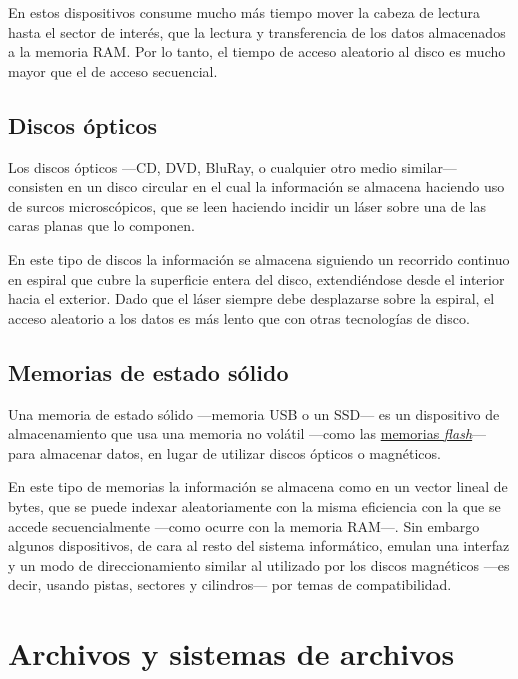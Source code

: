 En estos dispositivos consume mucho más tiempo mover la cabeza de
lectura hasta el sector de interés, que la lectura y transferencia de
los datos almacenados a la memoria RAM. Por lo tanto, el tiempo de
acceso aleatorio al disco es mucho mayor que el de acceso secuencial.

\subsection{Discos ópticos}\label{_discos_uxf3pticos}

Los discos ópticos ---CD, DVD, BluRay, o cualquier otro medio similar---
consisten en un disco circular en el cual la información se almacena
haciendo uso de surcos microscópicos, que se leen haciendo incidir un
láser sobre una de las caras planas que lo componen.

En este tipo de discos la información se almacena siguiendo un recorrido
continuo en espiral que cubre la superficie entera del disco,
extendiéndose desde el interior hacia el exterior. Dado que el láser
siempre debe desplazarse sobre la espiral, el acceso aleatorio a los
datos es más lento que con otras tecnologías de disco.

\subsection{Memorias de estado
sólido}\label{_memorias_de_estado_suxf3lido}

Una memoria de estado sólido ---memoria USB o un SSD--- es un
dispositivo de almacenamiento que usa una memoria no volátil ---como las
\href{https://es.wikipedia.org/wiki/Memoria_flash}{memorias
\emph{flash}}--- para almacenar datos, en lugar de utilizar discos
ópticos o magnéticos.

En este tipo de memorias la información se almacena como en un vector
lineal de bytes, que se puede indexar aleatoriamente con la misma
eficiencia con la que se accede secuencialmente ---como ocurre con la
memoria RAM---. Sin embargo algunos dispositivos, de cara al resto del
sistema informático, emulan una interfaz y un modo de direccionamiento
similar al utilizado por los discos magnéticos ---es decir, usando
pistas, sectores y cilindros--- por temas de compatibilidad.

\section{Archivos y sistemas de
archivos}\label{_archivos_y_sistemas_de_archivos}

